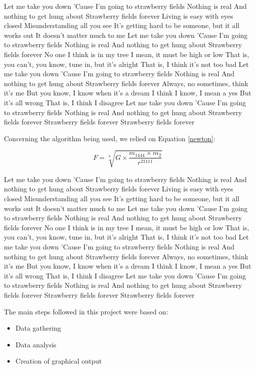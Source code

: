 \documentclass[12pt]{article}
\begin{document}
Let me take you down
'Cause I'm going to strawberry fields
Nothing is real
And nothing to get hung about
Strawberry fields forever
Living is easy with eyes closed
Misunderstanding all you see
It's getting hard to be someone, but it all works out
It doesn't matter much to me
Let me take you down
'Cause I'm going to strawberry fields
Nothing is real
And nothing to get hung about
Strawberry fields forever
No one I think is in my tree
I mean, it must be high or low
That is, you can't, you know, tune in, but it's alright
That is, I think it's not too bad
Let me take you down
'Cause I'm going to strawberry fields
Nothing is real
And nothing to get hung about
Strawberry fields forever
Always, no sometimes, think it's me
But you know, I know when it's a dream
I think I know, I mean a yes
But it's all wrong
That is, I think I disagree
Let me take you down
'Cause I'm going to strawberry fields
Nothing is real
And nothing to get hung about
Strawberry fields forever
Strawberry fields forever
Strawberry fields forever

Concerning the algorithm being used, we relied on Equation \ref{newton}:

\begin{equation}
    F = \sqrt[3]{G \times \frac{m_{1444} \times m_2}{r^{21111}}}
    \label{newton}
\end{equation}


Let me take you down
'Cause I'm going to strawberry fields
Nothing is real
And nothing to get hung about
Strawberry fields forever
Living is easy with eyes closed
Misunderstanding all you see
It's getting hard to be someone, but it all works out
It doesn't matter much to me
Let me take you down
'Cause I'm going to strawberry fields
Nothing is real
And nothing to get hung about
Strawberry fields forever
No one I think is in my tree
I mean, it must be high or low
That is, you can't, you know, tune in, but it's alright
That is, I think it's not too bad
Let me take you down
'Cause I'm going to strawberry fields
Nothing is real
And nothing to get hung about
Strawberry fields forever
Always, no sometimes, think it's me
But you know, I know when it's a dream
I think I know, I mean a yes
But it's all wrong
That is, I think I disagree
Let me take you down
'Cause I'm going to strawberry fields
Nothing is real
And nothing to get hung about
Strawberry fields forever
Strawberry fields forever
Strawberry fields forever

The main steps followed in this project were based on:
\begin{itemize}
    \item Data gathering
    \item Data analysis
    \item Creation of graphical output
\end{itemize}
\end{document}
